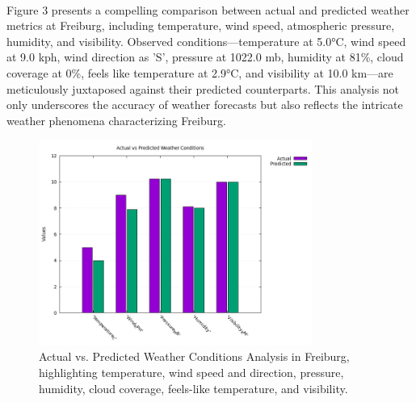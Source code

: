 \documentclass[12pt]{article}
\begin{document}
\paragraph{}Figure 3 presents a compelling comparison between actual and predicted weather metrics at Freiburg, including temperature, wind speed, atmospheric pressure, humidity, and visibility. Observed conditions—temperature at 5.0°C, wind speed at 9.0 kph, wind direction as 'S', pressure at 1022.0 mb, humidity at 81\%, cloud coverage at 0\%, feels like temperature at 2.9°C, and visibility at 10.0 km—are meticulously juxtaposed against their predicted counterparts. This analysis not only underscores the accuracy of weather forecasts but also reflects the intricate weather phenomena characterizing Freiburg.
\begin{figure}[h]
\centering
\includegraphics[width=0.8\textwidth]{data/graph/weather_comparison_graph.png}
\caption{Actual vs. Predicted Weather Conditions Analysis in Freiburg, highlighting temperature, wind speed and direction, pressure, humidity, cloud coverage, feels-like temperature, and visibility.}
\end{figure}
\end{document}

